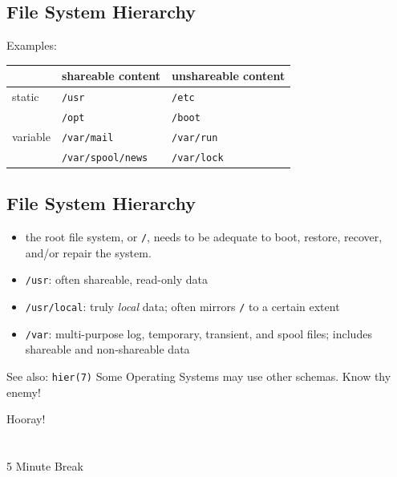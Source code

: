 \documentclass[xga]{xdvislides}
\begin{document}
\subsection{File System Hierarchy}
Examples:
\\

\begin{center}
\begin{tabular}{| l | l | l |}
	\hline
	& shareable content & unshareable content \\
	\hline
	static   & \verb+/usr+ & \verb+/etc+ \\
	         & \verb+/opt+ & \verb+/boot+ \\
	\hline
	variable & \verb+/var/mail+ & \verb+/var/run+ \\
	         & \verb+/var/spool/news+ & \verb+/var/lock+ \\
	\hline
\end{tabular}
\end{center}



\subsection{File System Hierarchy}
\begin{itemize}
	\item the root file system, or \verb+/+, needs to be adequate
		to boot, restore, recover, and/or repair the system.
	\item \verb+/usr+: often shareable, read-only data
	\item \verb+/usr/local+: truly {\em local} data; often mirrors
		\verb+/+ to a certain extent
	\item \verb+/var+: multi-purpose log, temporary, transient, and spool
		files; includes shareable and non-shareable data
\end{itemize}
See also: {\tt hier(7)}
\vspace{.5in}
Some Operating Systems may use other schemas.  Know thy enemy!

\newpage
\vspace*{\fill}
\begin{center}
    \Hugesize
        Hooray! \\ [1em]
    \hspace*{5mm}
    \blueline\\
    \hspace*{5mm}\\
        5 Minute Break
\end{center}
\vspace*{\fill}
\end{document}
